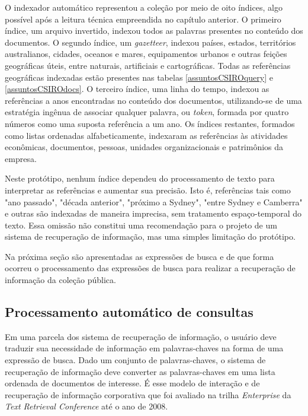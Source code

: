 O indexador automático representou a coleção por meio de oito índices, algo possível após a leitura técnica empreendida no capítulo anterior. O primeiro índice, um arquivo invertido, indexou todos as palavras presentes no conteúdo dos documentos. O segundo índice, um \textit{gazetteer}, indexou países, estados, territórios australianos, cidades, oceanos e mares, equipamentos urbanos e outras feições geográficas úteis, entre naturais, artificiais e cartográficas. Todas as referências geográficas indexadas estão presentes nas tabelas \ref{assuntosCSIROquery} e \ref{assuntosCSIROdocs}. O terceiro índice, uma linha do tempo, indexou as referências a anos encontradas no conteúdo dos documentos, utilizando-se de uma estratégia ingênua de associar qualquer palavra, ou \textit{token}, formada por quatro números como uma suposta referência a um ano. Os índices restantes, formados como listas ordenadas alfabeticamente, indexaram as referências às atividades econômicas, documentos, pessoas, unidades organizacionais e patrimônios da empresa.

Neste protótipo, nenhum índice dependeu do processamento de texto para interpretar as referências e aumentar sua precisão. Isto é, referências tais como "ano passado", "década anterior", "próximo a Sydney", "entre Sydney e Camberra" e outras são indexadas de maneira imprecisa, sem tratamento espaço-temporal do texto. Essa omissão não constitui uma recomendação para o projeto de um sistema de recuperação de informação, mas uma simples limitação do protótipo.

Na próxima seção são apresentadas as expressões de busca e de que forma ocorreu o processamento das expressões de busca para realizar a recuperação de informação da coleção pública.



\subsection{Processamento automático de consultas}
\label{prototipo-consultas}

Em uma parcela dos sistema de recuperação de informação, o usuário deve traduzir sua necessidade de informação em palavras-chaves na forma de uma expressão de busca. Dado um conjunto de palavras-chaves, o sistema de recuperação de informação deve converter as palavras-chaves em uma lista ordenada de documentos de interesse. É esse modelo de interação e de recuperação de informação corporativa que foi avaliado na trilha \textit{Enterprise} da \textit{Text Retrieval Conference} até o ano de 2008.

